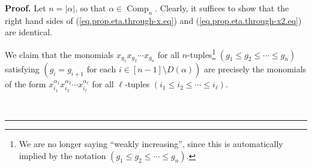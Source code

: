 \documentclass[numbers=enddot,12pt,final,onecolumn,notitlepage]{scrartcl}%
\theoremstyle{definition}
\newenvironment{proof}[1][Proof]{\noindent\textbf{#1.} }{\ \rule{0.5em}{0.5em}}
\newenvironment{vershort}{}{}
\begin{document}
\begin{vershort}


\begin{proof}
Let $n=\left\vert \alpha\right\vert $, so that $\alpha\in\operatorname*{Comp}%
\nolimits_{n}$. Clearly, it suffices to show that the right hand sides of
(\ref{eq.prop.eta.through-x.eq}) and (\ref{eq.prop.eta.through-x2.eq}) are identical.

We claim that the monomials $x_{g_{1}}x_{g_{2}}\cdots x_{g_{n}}$ for all
$n$-tuples\footnote{We are no longer saying ``weakly increasing'', since this
is automatically implied by the notation $\left(  g_{1}\leq g_{2}\leq
\cdots\leq g_{n}\right)  $.} $\left(  g_{1}\leq g_{2}\leq\cdots\leq
g_{n}\right)  $ satisfying $\left(  g_{i}=g_{i+1}\text{ for each }i\in\left[
n-1\right]  \setminus D\left(  \alpha\right)  \right)  $ are precisely the
monomials of the form $x_{i_{1}}^{\alpha_{1}}x_{i_{2}}^{\alpha_{2}}\cdots
x_{i_{\ell}}^{\alpha_{\ell}}$ for all $\ell$-tuples $\left(  i_{1}\leq
i_{2}\leq\cdots\leq i_{\ell}\right)  $.


\end{proof}
\end{vershort}
\end{document}
